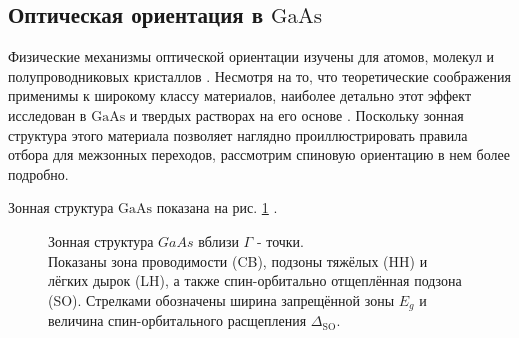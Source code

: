 \documentclass[14pt]{extarticle}
\newcommand{\gaas}{\mathrm{Ga}\mathrm{As}}
\numberwithin{equation}{section}
\begin{document}
\subsection{Оптическая ориентация в $\gaas$}

Физические механизмы оптической ориентации изучены для атомов, молекул и полупроводниковых кристаллов \cite{Auzinsh1995, zakharchenya_opt_or, Zutic}. Несмотря на то, что теоретические соображения применимы к широкому классу материалов, наиболее детально этот эффект исследован в $\gaas$ и твердых растворах на его основе \cite{zakharchenya_opt_or}. Поскольку зонная структура этого материала позволяет наглядно проиллюстрировать правила отбора для межзонных переходов, рассмотрим спиновую ориентацию в нем более подробно.

Зонная структура $\gaas$  показана на рис. \ref{fig:gaas_bandstructure} \cite{madelung1967}.

\begin{figure}[h!]   %
    \centering       %
    \caption{Зонная структура $GaAs$ вблизи  $\Gamma$ - точки. \\Показаны зона проводимости (CB), 
             подзоны тяжёлых (HH) и лёгких дырок (LH), а также спин-орбитально отщеплённая 
             подзона (SO). Стрелками обозначены ширина запрещённой зоны $E_g$ и 
             величина спин-орбитального расщепления $\Delta_{\text{SO}}$.}
    \label{fig:gaas_bandstructure}
\end{figure}
\end{document}
